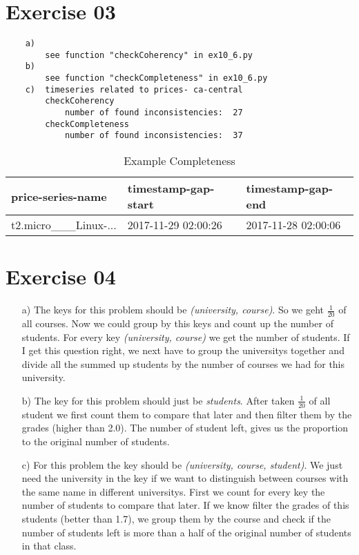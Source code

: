 \documentclass[11pt,a4paper]{scrartcl}
\begin{document}
\section*{Exercise 03}
\begin{verbatim}
	a) 
		see function "checkCoherency" in ex10_6.py
	b) 
		see function "checkCompleteness" in ex10_6.py
	c)	timeseries related to prices- ca-central
		checkCoherency
			number of found inconsistencies:  27
		checkCompleteness
			number of found inconsistencies:  37
\end{verbatim}

\begin{table}[]
\centering
\caption{Example Completeness}
\label{my-label}
\begin{tabular}{lll}
\hline
\multicolumn{1}{|l|}{price-series-name} & \multicolumn{1}{l|}{timestamp-gap-start} & \multicolumn{1}{l|}{timestamp-gap-end} \\ \hline
t2.micro\_\_\_Linux-...                 & 2017-11-29 02:00:26                      & 2017-11-28 02:00:06                   
\end{tabular}
\end{table}

\section*{Exercise 04}
	
\begin{itemize}
\item[a)] The keys for this problem should be \textit{(university, course)}. So we geht $\frac{1}{20}$ of all courses. Now we could group by this keys and count up the number of students. For every key \textit{(university, course)} we get the number of students. If I get this question right, we next have to group the universitys together and divide all the summed up students by the number of courses we had for this university.
\item[b)] The key for this problem should just be \textit{students}. After taken $\frac{1}{20}$ of all student we first count them to compare that later and then filter them by the grades (higher than 2.0). The number of student left, gives us the proportion to the original number of students.
\item[c)] For this problem the key should be \textit{(university, course, student)}. We just need the university in the key if we want to distinguish between courses with the same name in different universitys. First we count for every key the number of students to compare that later. If we know filter the grades of this students (better than 1.7), we group them by the course and check if the number of students left is more than a half of the original number of students in that class.
\end{itemize}
\end{document}
